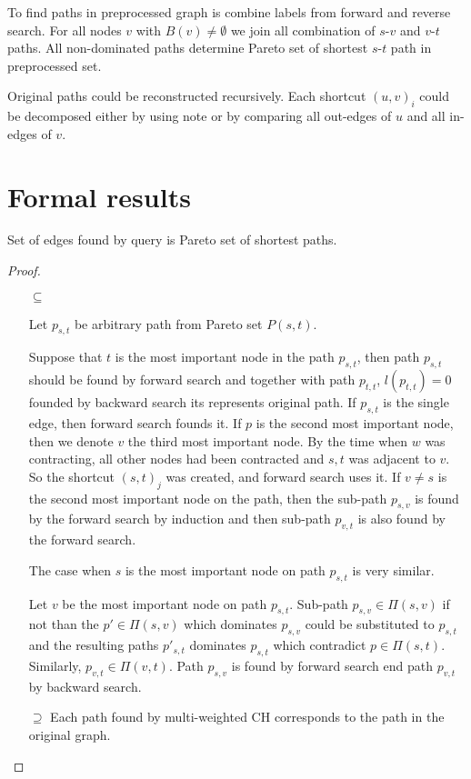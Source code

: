To find paths in preprocessed graph is combine labels from forward and reverse search. 
For all nodes $v$ with $B(v) \ne \emptyset$ we join all combination of $s$-$v$ and $v$-$t$ paths. 
All non-dominated paths determine Pareto set of shortest $s$-$t$ path in preprocessed set.

Original paths could be reconstructed recursively.
Each shortcut $(u,v)_i$ could be decomposed either by using note or 
by comparing all out-edges of $u$ and all in-edges of $v$.




\section{Formal results}
\begin{lemma}
Set of edges found by query is Pareto set of shortest paths.
\end{lemma}
\begin{proof}
\begin{itemize}
\item[$\subseteq$] 

Let $p_{s,t}$ be arbitrary path from Pareto set $P(s,t)$. 

Suppose that $t$ is the most important node in the path $p_{s,t}$, 
then path $p_{s,t}$ should be found by forward search
and together with path $p_{t,t}$, $l(p_{t,t})=0$ 
founded by backward search its represents original path.
If $p_{s,t}$ is the single edge, then forward search founds it.
If $p$ is the second most important node, then we denote $v$ the
third most important node. 
By the time when $w$ was contracting, all other nodes had been contracted
and $s,t$ was adjacent to $v$. So the shortcut $(s,t)_j$ was created, and forward search uses it.
If $v \ne s$ is the second most important node on the path,
then the sub-path $p_{s,v}$ is found by the forward search by induction and
then sub-path $p_{v,t}$ is also found by the forward search.

The case when $s$ is the most important node on path $p_{s,t}$ is very similar. 

Let $v$ be the most important node on path $p_{s,t}$. 
Sub-path $p_{s,v} \in \Pi(s,v)$ 
if not than the $p' \in \Pi(s,v)$ which dominates $p_{s,v}$ could be substituted
to $p_{s,t}$ and the resulting paths $p'_{s,t}$ dominates $p_{s,t}$ which contradict
$p \in \Pi(s,t)$.
Similarly, $p_{v,t} \in \Pi(v,t) $. Path $p_{s,v}$ is found by forward search end path
$p_{v,t}$ by backward search.

\item[$\supseteq$] 
Each path found by multi-weighted CH corresponds to the path in the original graph. 

\end{itemize}
\end{proof}

